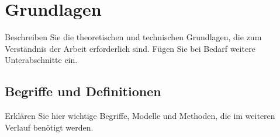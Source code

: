 \section{Grundlagen}

Beschreiben Sie die theoretischen und technischen Grundlagen, die zum Verständnis
der Arbeit erforderlich sind. Fügen Sie bei Bedarf weitere Unterabschnitte ein.

\subsection{Begriffe und Definitionen}

Erklären Sie hier wichtige Begriffe, Modelle und Methoden, die im weiteren Verlauf
benötigt werden.


